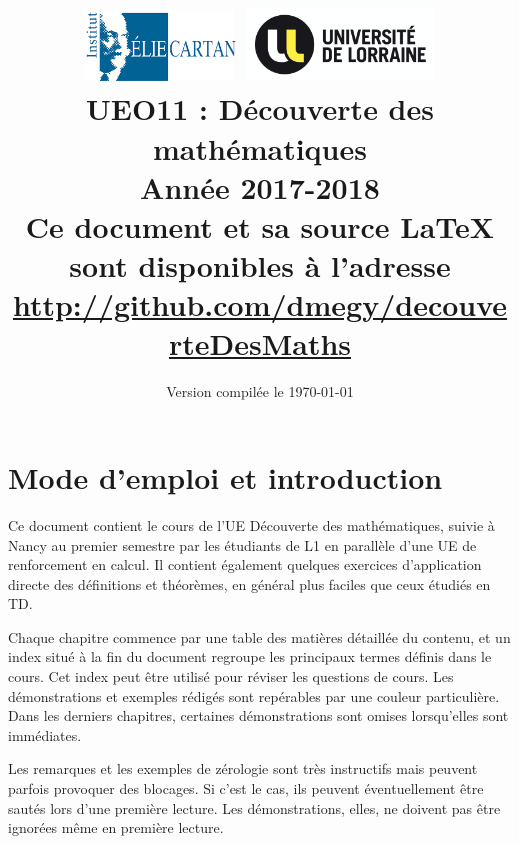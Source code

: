 \documentclass[11pt,a4paper]{book}
\theoremstyle{definition}
\theoremstyle{plain}
\begin{document}
\title{
\includegraphics[width=4cm]{logo-IECL}
\hfill
\includegraphics[width=5cm]{logo-UL}\\
\vspace{3em}
UEO11 : Découverte des mathématiques\\
Année 2017-2018\\
\vspace{3em}
{\small \faGithub{}  Ce document et sa source \LaTeX{} sont disponibles à l'adresse\\
\url{http://github.com/dmegy/decouverteDesMaths}}
}

\date{Version compilée le \today{}%
}


\maketitle

\tableofcontents




\section{Mode d'emploi et introduction}

Ce document contient le cours de l'UE \og Découverte des mathématiques\fg{}, suivie à Nancy au premier semestre par les étudiants de L1 en parallèle d'une UE de renforcement en calcul. Il contient également quelques exercices d'application directe des définitions et théorèmes, en général plus faciles que ceux étudiés en TD.

Chaque chapitre commence par une table des matières détaillée du contenu, et un index situé à la fin du document regroupe les principaux termes définis dans le cours. Cet index peut être utilisé pour réviser les questions de cours. Les démonstrations et exemples rédigés sont repérables par une couleur particulière. Dans les derniers chapitres, certaines démonstrations sont omises lorsqu'elles sont immédiates.

Les remarques et les exemples de \og zérologie\fg{} sont très instructifs mais peuvent parfois provoquer des blocages. Si c'est le cas, ils peuvent éventuellement être sautés lors d'une première lecture. Les démonstrations, elles, ne doivent pas être ignorées même en première lecture.
\end{document}
